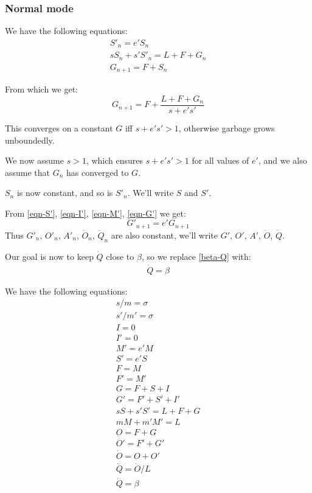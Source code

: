 \documentclass{article}
\begin{document}
\subsubsection{Normal mode}

We have the following equations:
\begin{gather*}
S'_n = e'S_n \\
sS_n + s'S'_n = L + F + G_n \\
G_{n+1} = F + S_n
\end{gather*}

From which we get:
\begin{equation}
G_{n+1} = F + \frac{L + F + G_n}{s + e's'}
\end{equation}

This converges on a constant $G$ iff $s + e's' > 1$,
otherwise garbage grows unboundedly.

We now assume $s > 1$, which ensures $s + e's' > 1$ for all values of
$e'$, and we also assume that $G_n$ has converged to $G$.

$S_n$ is now constant, and so is $S'_n$. We'll write $S$ and $S'$.

From \eqref{eqn-S'}, \eqref{eqn-I'}, \eqref{eqn-M'}, \eqref{eqn-G'} we get:
\begin{equation}
G'_{n+1} = e' G_{n+1}
\end{equation}
Thus $G'_n$, $O'_n$, $A'_n$, $\dot{O}_n$, $\dot{Q}_n$ are
also constant, we'll write $G'$, $O'$, $A'$, $\dot{O}$,
$\dot{Q}$.

Our goal is now to keep $\dot{Q}$ close to $\beta$, so we replace
\eqref{beta-Q} with:
\begin{gather}
\dot{Q} = \beta \label{beta-Qbar}
\end{gather}

We have the following equations:
\begin{gather*}
 s/m = \sigma \\
 s' / m' = \sigma \\
 I = 0 \\
 I' = 0 \\
 M' = e' M \\
 S' = e' S \\
 F = M \\
 F' = M' \\
 G = F + S + I \\
 G' = F' + S' + I' \\
 sS + s'S' = L + F + G \\
 mM + m'M' = L \\
 O = F + G \\
 O' = F' + G' \\
 \dot{O} = O + O' \\
 \dot{Q} = \dot{O} / L \\
 \dot{Q} = \beta
\end{gather*}
\end{document}
